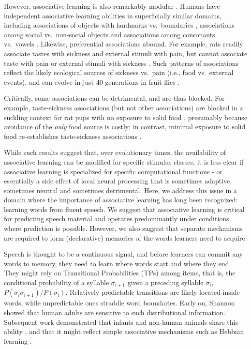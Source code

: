 \documentclass[]{article}
\begin{document}
However, associative learning is also remarkably modular \citep{Endress-duplications}. Humans have independent associative learning abilities in superficially similar domains, including associations of objects with landmarks vs.~boundaries \citep{Doeller2008}, associations among social vs.~non-social objects \citep{Tompson2019} and associations among consonants vs.~vowels \citep{Bonatti2005,Toro2008}. Likewise, preferential associations abound. For example, rats readily associate tastes with sickness and external stimuli with pain, but cannot associate taste with pain or external stimuli with sickness \citep{Garcia1974}. Such patterns of associations reflect the likely ecological sources of sickness vs.~pain (i.e., food vs.~external events), and can evolve in just 40 generations in fruit flies \citep{Dunlap2014}.

Critically, some associations can be detrimental, and are thus blocked. For example, taste-sickness associations (but not other associations) are blocked in a suckling context for rat pups with no exposure to solid food \citep{Martin1979, Alberts1984}, presumably because avoidance of the \emph{only} food source is costly; in contrast, minimal exposure to solid food re-establishes taste-sickness associations \citep{Gubernick1984}.

While such results suggest that, over evolutionary times, the availability of associative learning can be modified for specific stimulus classes, it is less clear if associative learning is specialized for specific computational functions - or essentially a side effect of local neural processing \citep[a ``spandrel'' in biological terms;][]{Gould1979} that is sometimes adaptive, sometimes neutral and sometimes detrimental. Here, we address this issue in a domain where the importance of associative learning has long been recognized: learning words from fluent speech. We suggest that associative learning is critical for predicting speech material and operates predominantly under conditions where prediction is possible. However, we also suggest that separate mechanisms are required to form (declarative) memories of the words learners need to acquire.

Speech is thought to be a continuous signal, and before learners can commit any words to memory, they need to learn where words start and where they end. They might rely on Transitional Probabilities (TPs) among items, that is, the conditional probability of a syllable \(\sigma_{i+1}\) given a preceding syllable \(\sigma_{i}\), \(P(\sigma_{i}\sigma_{i+1})/P(\sigma_{i})\). Relatively predictable transitions are likely located inside words, while unpredictable ones straddle word boundaries. Early on, Shannon \citep{Shannon1951} showed that human adults are sensitive to such distributional information. Subsequent work demonstrated that infants and non-human animals share this ability \citep{Aslin1998, Chen2015, Fiser2002, Hauser2001, Saffran-Science, Toro2005-backward}, and that it might reflect simple associative mechanisms such as Hebbian learning \citep{Endress-TP-Model}.
\end{document}
